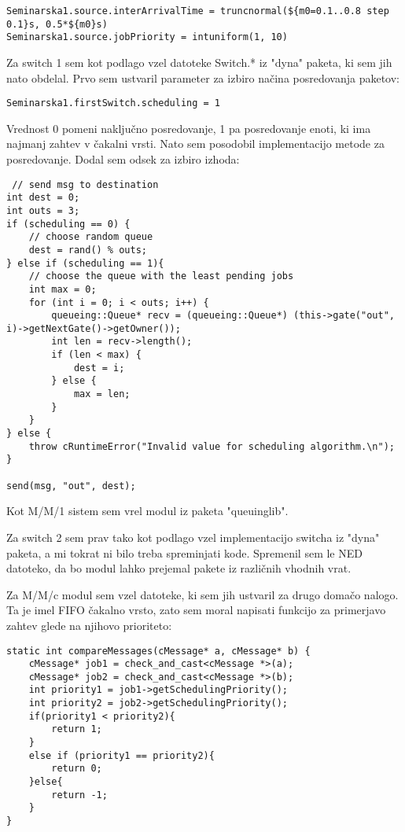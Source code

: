 \documentclass[11pt,a4paper,slovene]{myarticle}
\begin{document}
\begin{lstlisting}
Seminarska1.source.interArrivalTime = truncnormal(${m0=0.1..0.8 step 0.1}s, 0.5*${m0}s)
Seminarska1.source.jobPriority = intuniform(1, 10)
\end{lstlisting}


Za switch 1 sem kot podlago vzel datoteke Switch.* iz "dyna" paketa, ki sem jih nato obdelal. Prvo sem ustvaril parameter za izbiro načina posredovanja paketov:

\begin{lstlisting}
Seminarska1.firstSwitch.scheduling = 1
\end{lstlisting}

Vrednost 0 pomeni naključno posredovanje, 1 pa posredovanje enoti, ki ima najmanj zahtev v čakalni vrsti.
Nato sem posodobil implementacijo metode za posredovanje. Dodal sem odsek za izbiro izhoda:

\begin{lstlisting}
 // send msg to destination
int dest = 0;
int outs = 3;
if (scheduling == 0) {
    // choose random queue
    dest = rand() % outs;
} else if (scheduling == 1){
    // choose the queue with the least pending jobs
    int max = 0;
    for (int i = 0; i < outs; i++) {
        queueing::Queue* recv = (queueing::Queue*) (this->gate("out", i)->getNextGate()->getOwner());
        int len = recv->length();
        if (len < max) {
            dest = i;
        } else {
            max = len;
        }
    }
} else {
    throw cRuntimeError("Invalid value for scheduling algorithm.\n");
}

send(msg, "out", dest);
\end{lstlisting}


Kot M/M/1 sistem sem vrel modul iz paketa "queuinglib".

Za switch 2 sem prav tako kot podlago vzel implementacijo switcha iz "dyna" paketa, a mi tokrat ni bilo treba spreminjati kode. Spremenil sem le NED datoteko, da bo modul lahko prejemal pakete iz različnih vhodnih vrat.

Za M/M/c modul sem vzel datoteke, ki sem jih ustvaril za drugo domačo nalogo. Ta je imel FIFO čakalno vrsto, zato sem moral napisati funkcijo za primerjavo zahtev glede na njihovo prioriteto:

\begin{lstlisting}
static int compareMessages(cMessage* a, cMessage* b) {
    cMessage* job1 = check_and_cast<cMessage *>(a);
    cMessage* job2 = check_and_cast<cMessage *>(b);
    int priority1 = job1->getSchedulingPriority();
    int priority2 = job2->getSchedulingPriority();
    if(priority1 < priority2){
        return 1;
    }
    else if (priority1 == priority2){
        return 0;
    }else{
        return -1;
    }
}
\end{lstlisting}
\end{document}
